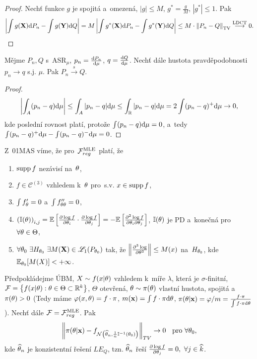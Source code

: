 \begin{proof}
	Nechť funkce $g$ je spojitá a~omezená, $|g|\leq M$, $g^\ast =\frac{g}{M}$, $|g^\ast|\leq 1$. Pak
	$$ \left| \int g(\textbf{X})\mathrm{d} P_n-\int g(\textbf{Y})\mathrm{d} Q \right|=M\left| \int g^\ast(\textbf{X})\mathrm{d} P_n-\int g^\ast(\textbf{Y})\mathrm{d} Q \right|\leq M\cdot \left\| P_n-Q\right\|_{\mathrm{TV}} \stackrel{\text{LDCT}}{\longrightarrow} 0.$$
\end{proof}
\begin{theorem}
	Mějme $P_n,Q$ s~ASR$_\mu$, $p_n=\frac{\mathrm{d} P_n}{\mathrm{d} \mu}$, $q=\frac{\mathrm{d} Q}{\mathrm{d} \mu}$. Nechť dále hustota pravděpodobnosti $p_n\to q$ s.j. $\mu$. Pak $P_n\stackrel{s}{\longrightarrow}Q$. 
	\begin{proof}
		$$ \left| \int_A (p_n-q)\mathrm{d}\mu \right|\leq \int_A|p_n-q|\mathrm{d}\mu\leq \int_{\mathbb{R}}|p_n-q|\mathrm{d}\mu=2\int(p_n-q)^+\mathrm{d}\mu\to0,$$
		kde poslední rovnost platí, protože $\int(p_n-q)\mathrm{d}\mu=0$, a~tedy $\int(p_n-q)^+\mathrm{d}\mu-\int(p_n-q)^-\mathrm{d}\mu=0$.	\end{proof}
\end{theorem}
\begin{remark} Z~01MAS víme, že pro~$\mathcal{F}_{reg}^{\mathrm{{\footnotesize MLE }}}$ platí, že \begin{enumerate}[1)]
		\item $\mathop{\mathrm{supp}} f$ nezávisí na~$\theta$,
		\item $f\in\mathcal{C}^{(3)}$ vzhledem k~$\theta$ pro~s.v. $x\in\mathop{\mathrm{supp}} f$,
		\item $\int f_\theta'=0$ a~$\int f_{\theta\theta}''=0$,
		\item $\left( \mathbb{I}(\theta) \right)_{i,j}=\mathbb{E}\left[ \frac{\partial\log f}{\partial \theta_i}\cdot\frac{\partial\log f}{\partial \theta_j} \right]=-\mathbb{E}\left[ \frac{\partial^2 \log f}{\partial\theta_i \partial \theta_j} \right]$, $\mathbb{I}(\theta)$ je PD a~konečná pro~$\forall\theta\in\Theta$,
		\item $\forall\theta_0~\exists H_{\theta_0}~\exists M(\textbf{X})\in\mathscr{L}_1(P_{\theta_0})$ tak, že $\left\| \frac{\partial^3\log }{\partial \theta^3}\right\|\leq M(x)$ na~$H_{\theta_0}$, kde $\mathbb{E}_{\theta_0}[M(X)]<+\infty$.
	\end{enumerate}
\end{remark}
\begin{theorem}
	Předpokládejme ÚBM, $X\sim f(x|\theta)$ vzhledem k~míře $\lambda$, která je $\sigma$-finitní, $\mathcal{F}=\left\{ f(x|\theta):\theta\in\Theta\subset \mathbb{R}^k \right\}$, $\Theta$ otevřená, $\theta\sim\pi(\theta)$ vlastní hustota, spojitá a~$\pi(\theta)>0$ (Tedy máme $\varphi(x,\theta)=f\cdot\pi$, $m(\textbf{x})=\int f\cdot \pi\mathrm{d}\theta$, $\pi(\theta|\textbf{x})=\varphi/m=\frac{f\cdot\pi}{\int f\cdot\pi\mathrm{d}\theta}$). Nechť dále $\mathcal{F}=\mathcal{F}_{reg}^{\mathrm{{\footnotesize MLE }}}$. Pak
	$$ \left\| \pi(\theta|\textbf{x})-f_{\mathcal{N}\left( \widehat{\theta}_n,\frac{1}{n}\mathbb{I}^{-1}(\theta_0) \right)} \right\|_{TV}\to0 \hspace{0.2cm}\text{ pro~}\forall \theta_0,$$
	kde $\widehat{\theta}_n$ je konzistentní řešení $LE_Q$, tzn. $\widehat{\theta}_n$ řeší $\frac{\partial \log f}{\partial \theta_j}=0,~\forall j\in\widehat{k}$.
\end{theorem}
